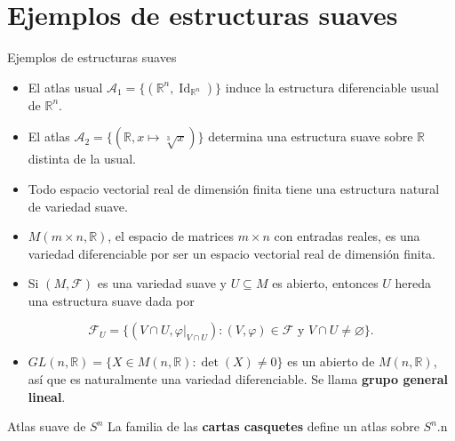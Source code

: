 \section{Ejemplos de estructuras suaves}
\begin{bookexample}{Ejemplos de estructuras suaves}
\begin{itemize}
\item El atlas usual $\mathcal{A}_1=\{ (\mathbb{R}^{n},\operatorname{Id}_{\mathbb{R}^{n}} )\}$ induce la estructura diferenciable usual de $\mathbb{R}^n$.
\item El atlas $\mathcal{A}_2=\{(\mathbb{R},x\mapsto \sqrt[3]{x})\}$ determina una estructura suave sobre $\mathbb{R}$ distinta de la usual.
\item Todo espacio vectorial real de dimensión finita tiene una estructura natural de variedad suave.
\item $M(m\times n,\mathbb{R})$, el espacio de matrices $m\times n$ con entradas reales, es una variedad diferenciable por ser un espacio vectorial real de dimensión finita.
\item Si $(M,\mathcal{F})$ es una variedad suave y $U\subseteq M$ es abierto, entonces $U$ hereda una estructura suave dada por
\end{itemize}
\[
\mathcal{F}_U=\{(V\cap U,\varphi|_{V\cap U}) : (V,\varphi)\in\mathcal{F}\text{ y }V\cap U\neq\varnothing\}.
\]
\begin{itemize}
\item $GL(n,\mathbb{R})=\{X\in M(n,\mathbb{R}) : \det(X)\neq 0\}$ es un abierto de $M(n,\mathbb{R})$, así que es naturalmente una variedad diferenciable. Se llama \textbf{grupo general lineal}.
\end{itemize}
\end{bookexample}
\begin{bookexample}{Atlas suave de $S^n$}
La familia de las \textbf{cartas casquetes} define un atlas sobre $S^n$.n

\end{bookexample}
